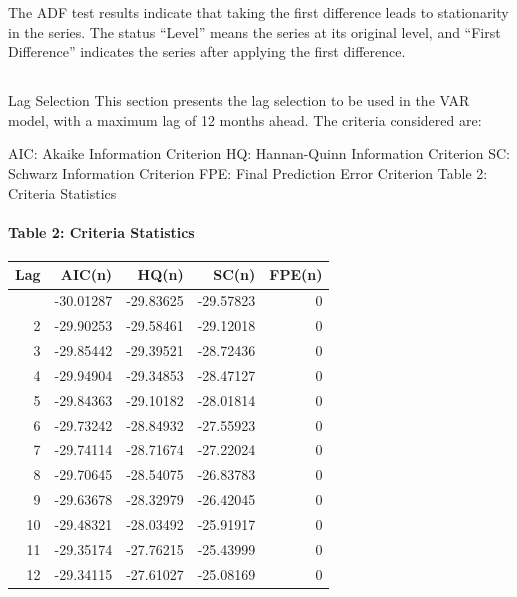 \documentclass[12pt]{article}
\begin{document}
The ADF test results indicate that taking the first difference leads to
stationarity in the series. The status ``Level'' means the series at its
original level, and ``First Difference'' indicates the series after
applying the first difference.

\hypertarget{section}{%
\subsection{}\label{section}}

Lag Selection This section presents the lag selection to be used in the
VAR model, with a maximum lag of 12 months ahead. The criteria
considered are:

AIC: Akaike Information Criterion HQ: Hannan-Quinn Information Criterion
SC: Schwarz Information Criterion FPE: Final Prediction Error Criterion
Table 2: Criteria Statistics

\hypertarget{table-2-criteria-statistics}{%
\paragraph{Table 2: Criteria
Statistics}\label{table-2-criteria-statistics}}

\begin{longtable}[]{@{}rrrrr@{}}
\toprule\noalign{}
Lag & AIC(n) & HQ(n) & SC(n) & FPE(n) \\
\midrule\noalign{}
\endhead
\bottomrule\noalign{}
\endlastfoot
1 & -30.01287 & -29.83625 & -29.57823 & 0 \\
2 & -29.90253 & -29.58461 & -29.12018 & 0 \\
3 & -29.85442 & -29.39521 & -28.72436 & 0 \\
4 & -29.94904 & -29.34853 & -28.47127 & 0 \\
5 & -29.84363 & -29.10182 & -28.01814 & 0 \\
6 & -29.73242 & -28.84932 & -27.55923 & 0 \\
7 & -29.74114 & -28.71674 & -27.22024 & 0 \\
8 & -29.70645 & -28.54075 & -26.83783 & 0 \\
9 & -29.63678 & -28.32979 & -26.42045 & 0 \\
10 & -29.48321 & -28.03492 & -25.91917 & 0 \\
11 & -29.35174 & -27.76215 & -25.43999 & 0 \\
12 & -29.34115 & -27.61027 & -25.08169 & 0 \\
\end{longtable}
\end{document}
